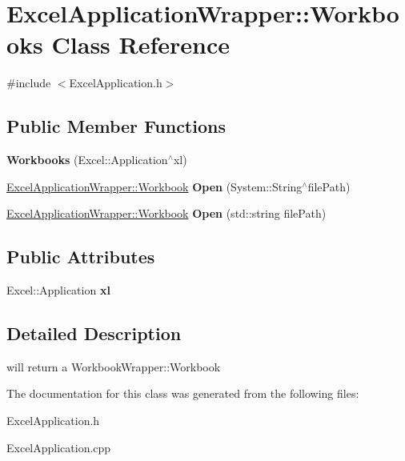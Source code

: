\hypertarget{class_excel_application_wrapper_1_1_workbooks}{}\section{Excel\+Application\+Wrapper\+:\+:Workbooks Class Reference}
\label{class_excel_application_wrapper_1_1_workbooks}


{\ttfamily \#include $<$Excel\+Application.\+h$>$}

\subsection*{Public Member Functions}
\begin{DoxyCompactItemize}
\item 
\hypertarget{class_excel_application_wrapper_1_1_workbooks_af9a4394e9252bf2a6632565c17d72c54}{}{\bfseries Workbooks} (Excel\+::\+Application$^\wedge$xl)\label{class_excel_application_wrapper_1_1_workbooks_af9a4394e9252bf2a6632565c17d72c54}

\item 
\hypertarget{class_excel_application_wrapper_1_1_workbooks_aa0f5c2b53f10cd82a5d44efb1c3fedc5}{}\hyperlink{class_excel_application_wrapper_1_1_workbook}{Excel\+Application\+Wrapper\+::\+Workbook} {\bfseries Open} (System\+::\+String$^\wedge$file\+Path)\label{class_excel_application_wrapper_1_1_workbooks_aa0f5c2b53f10cd82a5d44efb1c3fedc5}

\item 
\hypertarget{class_excel_application_wrapper_1_1_workbooks_aac469cfd2a798cad13bc4e87f1a09c38}{}\hyperlink{class_excel_application_wrapper_1_1_workbook}{Excel\+Application\+Wrapper\+::\+Workbook} {\bfseries Open} (std\+::string file\+Path)\label{class_excel_application_wrapper_1_1_workbooks_aac469cfd2a798cad13bc4e87f1a09c38}

\end{DoxyCompactItemize}
\subsection*{Public Attributes}
\begin{DoxyCompactItemize}
\item 
\hypertarget{class_excel_application_wrapper_1_1_workbooks_a1682ee0d4ea1ae2855ea571d63084416}{}Excel\+::\+Application {\bfseries xl}\label{class_excel_application_wrapper_1_1_workbooks_a1682ee0d4ea1ae2855ea571d63084416}

\end{DoxyCompactItemize}


\subsection{Detailed Description}
will return a Workbook\+Wrapper\+::\+Workbook 

The documentation for this class was generated from the following files\+:\begin{DoxyCompactItemize}
\item 
Excel\+Application.\+h\item 
Excel\+Application.\+cpp\end{DoxyCompactItemize}
